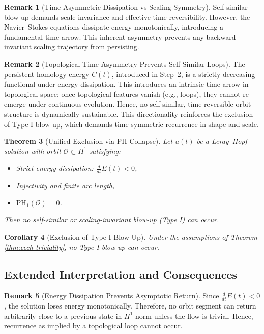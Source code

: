 \documentclass[11pt]{article}
\newtheorem{theorem}{Theorem}[section]
\newtheorem{corollary}[theorem]{Corollary}
\theoremstyle{definition}
\newtheorem{remark}[theorem]{Remark}
\begin{document}
\begin{remark}[Time-Asymmetric Dissipation vs Scaling Symmetry]
Self-similar blow-up demands scale-invariance and effective time-reversibility. However, the Navier--Stokes equations dissipate energy monotonically, introducing a fundamental time arrow. This inherent asymmetry prevents any backward-invariant scaling trajectory from persisting.
\end{remark}

\begin{remark}[Topological Time-Asymmetry Prevents Self-Similar Loops]
The persistent homology energy $C(t)$, introduced in Step~2, is a strictly decreasing functional under energy dissipation. This introduces an intrinsic time-arrow in topological space: once topological features vanish (e.g., loops), they cannot re-emerge under continuous evolution. Hence, no self-similar, time-reversible orbit structure is dynamically sustainable. This directionality reinforces the exclusion of Type I blow-up, which demands time-symmetric recurrence in shape and scale.
\end{remark}

\begin{theorem}[Unified Exclusion via PH Collapse]
Let $u(t)$ be a Leray--Hopf solution with orbit $\mathcal{O} \subset H^1$ satisfying:
\begin{itemize}
  \item Strict energy dissipation: $\frac{d}{dt} E(t) < 0$,
  \item Injectivity and finite arc length,
  \item $\mathrm{PH}_1(\mathcal{O}) = 0$.
\end{itemize}
Then no self-similar or scaling-invariant blow-up (Type I) can occur.
\end{theorem}

\begin{corollary}[Exclusion of Type I Blow-Up]
Under the assumptions of Theorem \ref{thm:cech-triviality}, no Type I blow-up can occur.
\end{corollary}

\subsection{Extended Interpretation and Consequences}

\begin{remark}[Energy Dissipation Prevents Asymptotic Return]
Since $\frac{d}{dt} E(t) < 0$, the solution loses energy monotonically. Therefore, no orbit segment can return arbitrarily close to a previous state in $H^1$ norm unless the flow is trivial. Hence, recurrence as implied by a topological loop cannot occur.
\end{remark}
\end{document}

